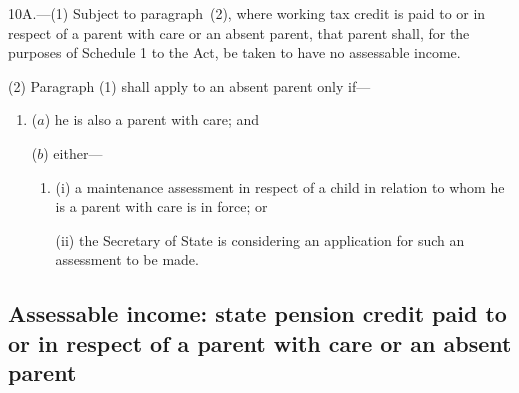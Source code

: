 \documentclass[12pt,a4paper]{article}
\begin{document}
10A.—(1) Subject to paragraph~(2), where 
working tax credit  %
is paid to or in respect of a parent with care or an absent parent, that parent shall, for the purposes of Schedule 1 to the Act, be taken to have no assessable income.

(2) Paragraph (1) shall apply to an absent parent only if—
\begin{enumerate}\item[]
($a$) he is also a parent with care; and

($b$) either—
\begin{enumerate}\item[]
(i) a maintenance assessment in respect of a child in relation to whom he is a parent with care is in force; or

(ii) the 
Secretary of State  %
is considering an application for such an assessment to be made.
\end{enumerate}
\end{enumerate}


\subsection[10B. Assessable income: state pension credit paid to or in respect of a parent with care or an absent parent]{Assessable income: state pension credit paid to or in respect of a parent with care or an absent parent}
\end{document}
